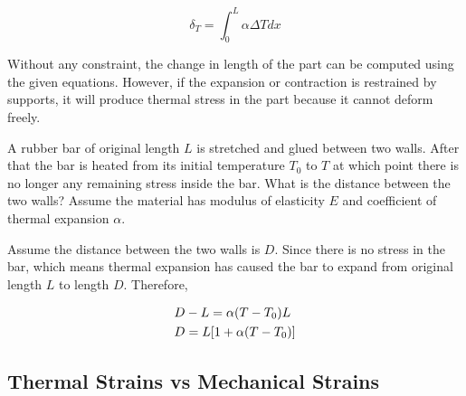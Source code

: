 \documentclass[
fontsize=10pt,
a4paper,
twosides=false,
open=any,
svgnames,
]{kaobook} %
\begin{document}
\begin{equation}
  \delta _T = \int_0^L \alpha \Delta Tdx
\end{equation}

Without any constraint, the change in length of the part can be computed using the given equations. However, if the expansion or contraction is restrained by supports, it will produce thermal stress in the part because it cannot deform freely.

\begin{example}
  
  A rubber bar of original length $L$ is stretched and glued between two walls. After that the bar is heated from its initial temperature $T_0$ to $T$ at which point there is no longer any remaining stress inside the bar. What is the distance between the two walls? Assume the material has modulus of elasticity $E$ and coefficient of thermal expansion $\alpha$.
  
  \begin{figure}[H]
    \centering
  \end{figure}
  
  Assume the distance between the two walls is $D$. Since there is no stress in the bar, which means thermal expansion has caused the bar to expand from original length $L$ to length $D$. Therefore,
  
\[\begin{gathered}
  D - L = \alpha (T - {T_0})L \hfill \\
  D = L[1 + \alpha (T - {T_0})] \hfill \\ 
\end{gathered}\]
	
\end{example}

\subsection{Thermal Strains vs Mechanical Strains}
\end{document}

